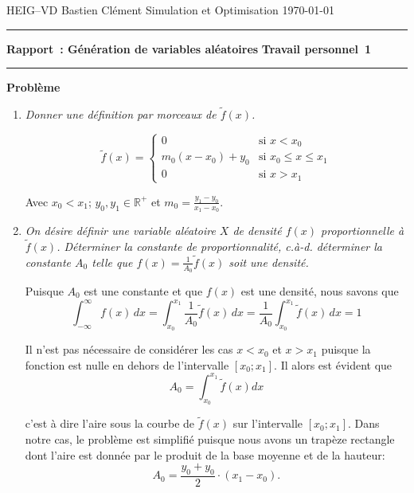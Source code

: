 \documentclass[a4paper,11pt]{report}
\newcounter{numero}
\newcommand{\exo}{
	{\large
		\vspace{5mm}
		\addtocounter{numero}{1}
		{\bf Problème~\thenumero}
		\vspace{2mm}
	}
}
\begin{document}
	
{\sc HEIG--VD} \hfill Bastien Clément\newline 
Simulation et Optimisation \hfill \today \newline
\hrule
\vspace{2mm}
{\large \bf Rapport~: Génération de variables aléatoires} \hfill {\large \bf Travail personnel~1}
\vspace{4mm}
\hrule

\exo
\begin{enumerate}[\indent a)]\itemsep3mm
	
\item {\em Donner une définition par morceaux de $\tilde{f}(x)$.}

\begin{equation*}
\tilde{f}(x) = \left\lbrace \begin{array}{ll}
	0						& \text{si $x < x_0$} \\
	m_0 ( x - x_0 ) + y_0	& \text{si $x_0 \leq x \leq x_1$} \\
	0 						& \text{si $x > x_1$}
\end{array} \right.
\end{equation*}

Avec $x_0 < x_1$; $y_0, y_1 \in \mathbb{R}^{+}$ et $m_0 = \frac{y_1-y_0}{x_1-x_0}$.

\item {\em On désire définir une variable aléatoire $X$ de densité $f(x)$ proportionnelle à $\tilde{f}(x)$. Déterminer la constante de proportionnalité, c.à-d. déterminer la constante $A_{0}$ telle que $f(x) = \frac{1}{A_{0}}\tilde{f}(x)$ soit une densité.}

Puisque $A_{0}$ est une constante et que $f(x)$ est une densité, nous savons que
\begin{equation*}
	\int_{-\infty}^{\infty} f(x)\,dx =
	\int_{x_0}^{x_1} \frac{1}{A_0} \tilde{f}(x)\,dx =
	\frac{1}{A_0} \int_{x_0}^{x_1} \tilde{f}(x)\,dx = 1
\end{equation*}

Il n'est pas nécessaire de considérer les cas $x < x_0$ et $x > x_1$ puisque la fonction est nulle en dehors de l'intervalle $[x_0; x_1]$. Il alors est évident que
\begin{equation*}
	A_0 = \int_{x_0}^{x_1} \tilde{f}(x)dx
\end{equation*}

c'est à dire l'aire sous la courbe de $\tilde{f}(x)$ sur l'intervalle $[x_0; x_1]$. Dans notre cas, le problème est simplifié puisque nous avons un trapèze rectangle dont l'aire est donnée par le produit de la base moyenne et de la hauteur:
\begin{equation*}
	A_0 = \frac{y_0 + y_0}{2} \cdot (x_1 - x_0).
\end{equation*}


\end{enumerate}
\end{document}
